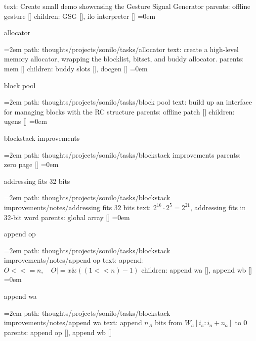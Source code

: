 \smallskip
text:  Create small demo showcasing the Gesture Signal Generator
\smallskip
parents:  offline gesture []
\smallskip
children: GSG [], ilo interpreter []
\smallskip
\leftskip=0em
\par\endgroup
\bigskip
{}
allocator
\smallskip
\par\begingroup
\leftskip=2em
path: thoughts/projects/sonilo/tasks/allocator
\smallskip
text:  create a high-level memory allocator, wrapping the blocklist, bitset, and buddy allocator.
\smallskip
parents:  mem []
\smallskip
children: buddy slots [], docgen []
\smallskip
\leftskip=0em
\par\endgroup
\bigskip
{}
block pool
\smallskip
\par\begingroup
\leftskip=2em
path: thoughts/projects/sonilo/tasks/block pool
\smallskip
text:  build up an interface for managing blocks with the RC structure
\smallskip
parents:  offline patch []
\smallskip
children: ugens []
\smallskip
\leftskip=0em
\par\endgroup
\bigskip
{}
blockstack improvements
\smallskip
\par\begingroup
\leftskip=2em
path: thoughts/projects/sonilo/tasks/blockstack improvements
\smallskip
parents:  zero page []
\smallskip
\leftskip=0em
\par\endgroup
\bigskip
{}
addressing fits 32 bits
\smallskip
\par\begingroup
\leftskip=2em
path: thoughts/projects/sonilo/tasks/blockstack improvements/notes/addressing fits 32 bits
\smallskip
text:  $2^16 \cdot 2^5 = 2^21$, addressing fits in 32-bit word
\smallskip
parents:  global array []
\smallskip
\leftskip=0em
\par\endgroup
\bigskip
{}
append op
\smallskip
\par\begingroup
\leftskip=2em
path: thoughts/projects/sonilo/tasks/blockstack improvements/notes/append op
\smallskip
text:  append: $O <<= n, \quad O |= x \& ((1 << n) - 1)$
\smallskip
children: append wa [], append wb []
\smallskip
\leftskip=0em
\par\endgroup
\bigskip
{}
append wa
\smallskip
\par\begingroup
\leftskip=2em
path: thoughts/projects/sonilo/tasks/blockstack improvements/notes/append wa
\smallskip
text:  append $n_A$ bits from $W_a[i_a:i_a + n_a]$ to 0
\smallskip
parents:  append op [], append wb []
\smallskip
